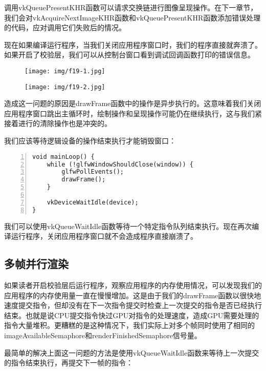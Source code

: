 \documentclass{ctexart}
\begin{document}
调用vkQueuePresentKHR函数可以请求交换链进行图像呈现操作。在下一章节，我们会对vkAcquireNextImageKHR函数和vkQueuePresentKHR函数添加错误处理的代码，应对调用它们失败后的情况。

现在如果编译运行程序，当我们关闭应用程序窗口时，我们的程序直接就奔溃了。如果开启了校验层，我们可以从控制台窗口看到调试回调函数打印的错误信息。

\begin{figure}[H]
	\centering
	\texttt{[image: img/f19-1.jpg]}
\end{figure}

\begin{figure}[H]
	\centering
	\texttt{[image: img/f19-2.jpg]}
\end{figure}

造成这一问题的原因是drawFrame函数中的操作是异步执行的。这意味着我们关闭应用程序窗口跳出主循环时，绘制操作和呈现操作可能仍在继续执行，这与我们紧接着进行的清除操作也是冲突的。

我们应该等待逻辑设备的操作结束执行才能销毁窗口：

\begin{lstlisting}[language={[ANSI]C},keywordstyle=\color{blue!70},commentstyle=\color{red!50!green!50!blue!50},frame=shadowbox, rulesepcolor=\color{red!20!green!20!blue!20},basicstyle=\small,numbers=left, numberstyle=\tiny,breaklines=true]
void mainLoop() {
	while (!glfwWindowShouldClose(window)) {
		glfwPollEvents();
		drawFrame();
	}

	vkDeviceWaitIdle(device);
}
\end{lstlisting}

我们可以使用vkQueueWaitIdle函数等待一个特定指令队列结束执行。现在再次编译运行程序，关闭应用程序窗口就不会造成程序直接崩溃了。

\subsection{多帧并行渲染}

如果读者开启校验层后运行程序，观察应用程序的内存使用情况，可以发现我们的应用程序的内存使用量一直在慢慢增加。这是由于我们的drawFrame函数以很快地速度提交指令，但却没有在下一次指令提交时检查上一次提交的指令是否已经执行结束。也就是说CPU提交指令快过GPU对指令的处理速度，造成GPU需要处理的指令大量堆积。更糟糕的是这种情况下，我们实际上对多个帧同时使用了相同的imageAvailableSemaphore和renderFinishedSemaphore信号量。

最简单的解决上面这一问题的方法是使用vkQueueWaitIdle函数来等待上一次提交的指令结束执行，再提交下一帧的指令：
\end{document}
